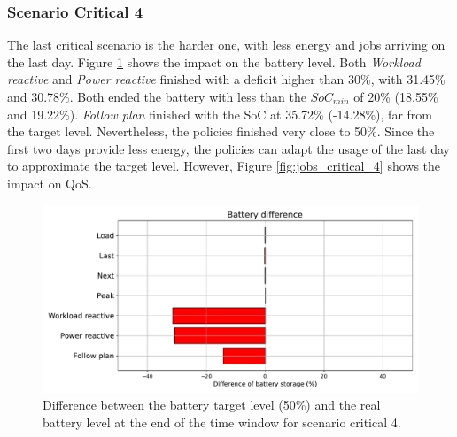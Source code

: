 \subsubsection{Scenario Critical 4}

The last critical scenario is the harder one, with less energy and jobs arriving on the last day. Figure \ref{fig:SoC_critical_4} shows the impact on the battery level. Both \emph{Workload reactive} and \emph{Power reactive} finished with a deficit higher than 30\%, with 31.45\% and 30.78\%. Both ended the battery with less than the $SoC_{min}$ of 20\% (18.55\% and 19.22\%). \emph{Follow plan} finished with the SoC at 35.72\% (-14.28\%), far from the target level. Nevertheless, the policies finished very close to 50\%. Since the first two days provide less energy, the policies can adapt the usage of the last day to approximate the target level. However, Figure \ref{fig:jobs_critical_4} shows the impact on QoS.

\begin{figure}[!htb]
    \centering
    \includegraphics[scale=0.55]{Images/Compensations/battery_critical_4.pdf}
    \caption{Difference between the battery target level (50\%) and the real battery level at the end of the time window for scenario critical 4.}
    \label{fig:SoC_critical_4}
\end{figure}

